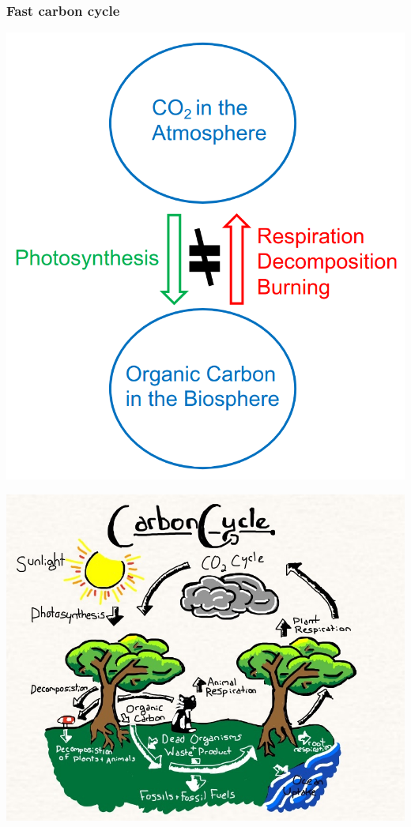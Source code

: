 \documentclass[11pt]{article}
\begin{document}
\newpage

\subsubsection{Fast carbon cycle}
\label{sec:org6ee1f51}
\begin{center}
\includegraphics[scale=0.55]{./images/fast-carbon-cycle-diagram.png}
\end{center}

\begin{center}
\includegraphics[width=.9\linewidth]{./images/fast-carbon-cycle-picture.jpg}
\end{center}
\end{document}
